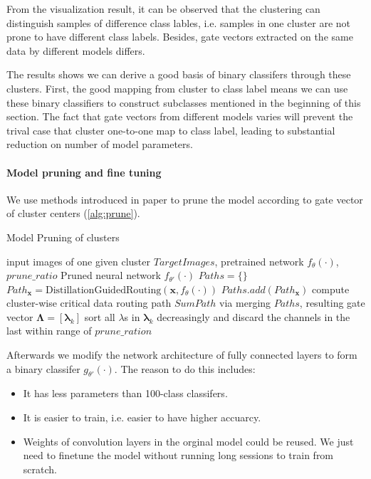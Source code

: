 \documentclass[sigplan,10pt,review]{acmart}\settopmatter{printfolios=true,printccs=false,printacmref=false}
\begin{document}
From the visualization result, it can be observed that the clustering can distinguish samples of difference class lables, i.e. samples in one cluster are not prone to have different class labels. Besides, gate vectors extracted on the same data by different models differs.

The results shows we can derive a good basis of binary classifers through these clusters. First, the good mapping from cluster to class label means we can use these binary classifiers to construct subclasses mentioned in the beginning of this section. The fact that gate vectors from different models varies will prevent the trival case that cluster one-to-one map to class label, leading to substantial reduction on number of model parameters.

\paragraph{Model pruning and fine tuning}

We use methods introduced in paper \cite{LiDongYue} to prune the model according to gate vector of cluster centers (\cref{alg:prune}).

\begin{algorithm}
	\caption{Model Pruning of clusters}
	\label{alg:prune}
	\begin{algorithmic}[1]
		\Require input images of one given cluster $TargetImages$, pretrained network $f_\theta(\cdot)$, $prune\_ratio$
		\Ensure Pruned neural network $f_{\theta'}(\cdot)$
		\State $Paths = \{\}$
			\State $Path_{\boldsymbol{x}} = \mathrm{DistillationGuidedRouting}(\boldsymbol{x}, f_\theta(\cdot))$
			\State $Paths.add(Path_{\boldsymbol{x}})$
		\EndFor		
		\State compute cluster-wise critical data routing path $SumPath$ via merging $Paths$, resulting gate vector $\boldsymbol{\Lambda} = [\boldsymbol{\lambda}_k]$
			\State sort all $\lambda$s in $\boldsymbol{\lambda}_k$ decreasingly and discard the channels in the last within range of $prune\_ration$
		\EndFor
	\end{algorithmic}
\end{algorithm}

Afterwards we modify the network architecture of fully connected layers to form a binary classifer $g_{\theta'}(\cdot)$. The reason to do this includes:
\begin{itemize}
	\item It has less parameters than 100-class classifers.
	\item It is easier to train, i.e. easier to have higher accuarcy.
	\item Weights of convolution layers in the orginal model could be reused. We just need to finetune the model without running long sessions to train from scratch.
\end{itemize} 
\end{document}
